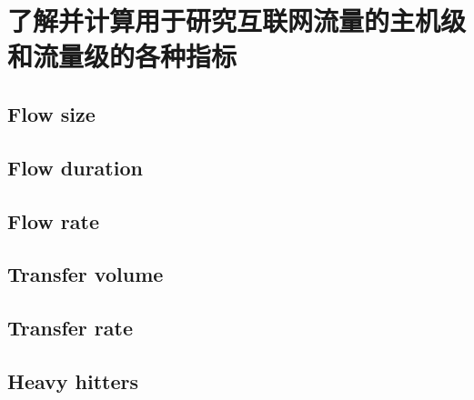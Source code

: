 \section{了解并计算用于研究互联网流量的主机级和流量级的各种指标}

\subsection{Flow size}
\subsection{Flow duration}
\subsection{Flow rate}
\subsection{Transfer volume}
\subsection{Transfer rate}
\subsection{Heavy hitters}

